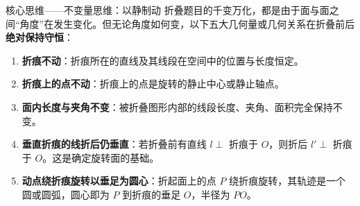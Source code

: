 \documentclass[11pt,a4paper]{ctexart}
\begin{document}
\begin{keybox}{核心思维——不变量思维：以静制动}
折叠题目的千变万化，都是由于面与面之间“角度”在发生变化。但无论角度如何变，以下五大几何量或几何关系在折叠前后\textbf{绝对保持守恒}：
\begin{enumerate}[label=\arabic*., leftmargin=2em, itemsep=0.1em]
  \item \textbf{折痕不动}：折痕所在的直线及其线段在空间中的位置与长度恒定。
  \item \textbf{折痕上的点不动}：折痕上的点是旋转的静止中心或静止轴点。
  \item \textbf{面内长度与夹角不变}：被折叠图形内部的线段长度、夹角、面积完全保持不变。
  \item \textbf{垂直折痕的线折后仍垂直}：若折叠前有直线 $l \perp$ 折痕于 $O$，则折后 $l' \perp$ 折痕于 $O$。这是确定旋转面的基础。
  \item \textbf{动点绕折痕旋转以垂足为圆心}：折起面上的点 $P$ 绕折痕旋转，其轨迹是一个圆或圆弧，圆心即为 $P$ 到折痕的垂足 $O$，半径为 $PO$。
\end{enumerate}
\end{keybox}
\end{document}
